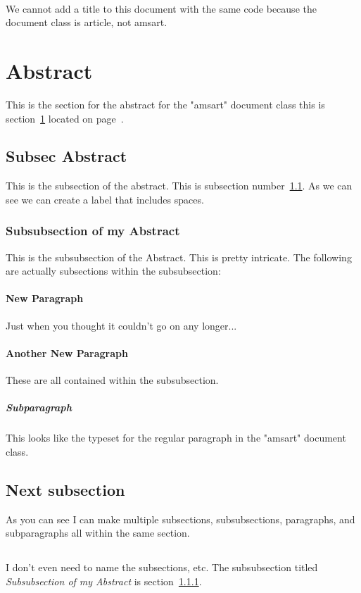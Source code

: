 \documentclass[twocolumn]{article} %
\begin{document}
\layout %
\ \newpage

	We cannot add a title to this document with the same code because
	the document class is article, not amsart. 

\section{Abstract} \label{S:abstract}
This is the section for the abstract for the "amsart" document class this is section~\ref{S:abstract} located on page~\pageref{S:abstract}.
\subsection{Subsec Abstract} \label{SS:Subsec Abstract}
This is the subsection of the abstract. This is subsection number~\ref{SS:Subsec Abstract}. As we can see we can create a label that includes spaces. 
\subsubsection{Subsubsection of my Abstract} \label{SSS:Subsec Abstract}
This is the subsubsection of the Abstract. This is pretty intricate. The following are actually subsections within the subsubsection:
\paragraph{New Paragraph}
Just when you thought it couldn't go on any longer...
\paragraph{Another New Paragraph}
These are all contained within the subsubsection.
\subparagraph{Subparagraph}
This looks like the typeset for the regular paragraph in the "amsart" document class.
\subsection{Next subsection}
As you can see I can make multiple subsections, subsubsections, paragraphs, and subparagraphs all within the same section.
\subsection{}
I don't even need to name the subsections, etc. The subsubsection titled \emph{Subsubsection of my Abstract} is section~\ref{SSS:Subsec Abstract}.
\end{document}

